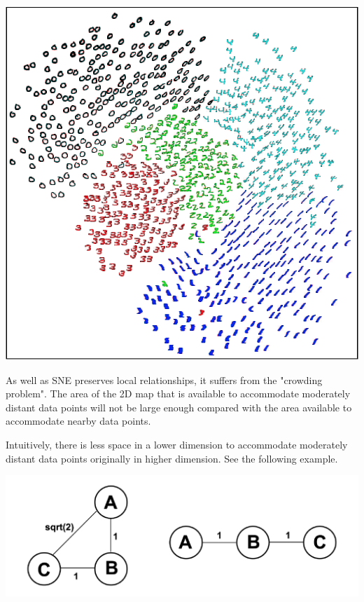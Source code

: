 \begin{center}
    \includegraphics[scale=0.5]{chapter_7/files/fig1.png}
\end{center}

\noindent As well as SNE preserves local relationships, it suffers
from the "crowding problem". The area of the 2D map that is available
to accommodate moderately distant data points will not be large enough
compared with the area available to accommodate nearby data points.

Intuitively, there is less space in a lower dimension to accommodate moderately distant data points originally in higher dimension. See the following example.

\begin{center}
    \includegraphics[scale=0.4]{chapter_7/files/fig2.png}
\end{center}

